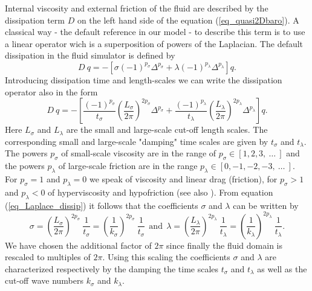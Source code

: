 Internal viscosity and external friction of the fluid are described by 
the dissipation term $D$ on the left hand side of the equation 
(\ref{eq_quasi2Dbaro}). A classical way - the default reference in our
 model - to describe this term is to use a linear operator wich is a
superposition of powers of the Laplacian. 
The default dissipation in the fluid simulator is defined by
\begin{equation} \label{eq_Laplace_dissip}
  D \ q = - \left[\sigma \left(-1 \right)^{p_{\sigma}} \Delta^{p_{\sigma}}
                     +
                  \lambda \left(-1 \right)^{p_{\lambda}} \Delta^{p_{\lambda}}
            \right] q.
\end{equation}
Introducing dissipation time and length-scales we can write the 
dissipation operator also in the form 
\begin{equation} \label{eq_Laplace_dissip_02}
  D \ q = - \left[ 
              \frac{\left(-1 \right)^{p_{\sigma}}}{t_{\sigma}} 
              \left( 
               \frac{L_{\sigma}}{2 \pi}
              \right)^{2 p_{\sigma}}
              \Delta^{p_{\sigma}}
               +
              \frac{\left(-1 \right)^{p_{\lambda}}}{t_{\lambda}} 
              \left( 
                \frac{L_{\lambda}}{2 \pi}
              \right)^{2 p_{\lambda}}
              \Delta^{p_{\lambda}}
            \right] q.
\end{equation}
Here $L_{\sigma}$ and $L_{\lambda}$ are the small and 
large-scale cut-off length scales. The corresponding small and 
large-scale "damping" time scales are given by $t_{\sigma}$ 
and $t_{\lambda}$. The powers $p_{\sigma}$ of small-scale 
viscosity are in the range of $p_{\sigma} \in [1,2,3, \ \dots \ ]$ 
and the powers $p_{\lambda}$ of large-scale friction are in the 
range $p_{\lambda} \in [0,-1,-2,-3, \ \dots \ ]$. 
For $p_{\sigma} = 1$ and $p_{\lambda} = 0$ we speak of viscosity
and linear drag (friction), for $p_{\sigma} > 1$ and $p_{\lambda} < 0$
of hyperviscosity and hypofriction (see also \cite{danilovandgurarie2001}).
From equation (\ref{eq_Laplace_dissip}) it follows that the coefficients
$\sigma$ and $\lambda$ can be written by
\begin{equation} \label{eq_siglam}
  \sigma  = \left(\frac{L_{\sigma}}{2 \pi} \right)^{2 p_{\sigma}}
            \ \frac{1}{t_{\sigma}} 
          = \left(\frac{1}{k_{\sigma}}\right)^{2 p_{\sigma}}
            \ \frac{1}{t_{\sigma}} 
  \ \ \mbox{and} \ \
  \lambda = \left(\frac{L_{\lambda}}{2 \pi} \right)^{2 p_{\lambda}}
            \ \frac{1}{t_{\lambda}}
          = \left(\frac{1}{k_{\lambda}} \right)^{2 p_{\lambda}}
            \ \frac{1}{t_{\lambda}}.
\end{equation}
We have chosen the additional factor of $2 \pi$ since finally the
fluid domain is rescaled to multiples of $2 \pi$. Using this scaling
the coefficients $\sigma$ and $\lambda$ are characterized respectively 
by the damping the time scales $t_{\sigma}$ and $t_{\lambda}$ as well
as the cut-off wave numbers $k_{\sigma}$ and $k_{\lambda}$.

